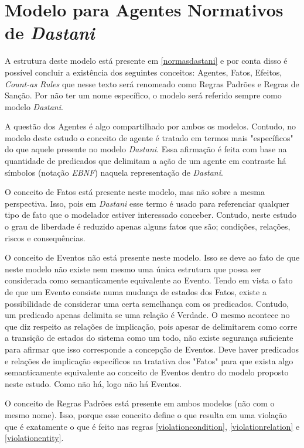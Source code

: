 \section{Modelo para Agentes Normativos de \textit{Dastani}}

A estrutura deste modelo está presente em \ref{normasdastani} e por conta disso é possível concluir a existência dos seguintes conceitos: Agentes, Fatos, Efeitos, \textit{Count-as Rules} que nesse texto será renomeado como Regras Padrões e Regras de Sanção. Por não ter um nome específico, o modelo será referido sempre como modelo \textit{Dastani}. 

A questão dos Agentes é algo compartilhado por ambos os modelos. Contudo, no modelo deste estudo o conceito de agente é tratado em termos mais "específicos" do que aquele presente no modelo \textit{Dastani}. Essa afirmação é feita com base na quantidade de predicados que delimitam a ação de um agente em contraste há símbolos (notação \textit{EBNF}) naquela representação de \textit{Dastani}. 

O conceito de Fatos está presente neste modelo, mas não sobre a mesma perspectiva. Isso, pois em \textit{Dastani} esse termo é usado para referenciar qualquer tipo de fato que o modelador estiver interessado conceber. Contudo, neste estudo o grau de liberdade é reduzido apenas alguns fatos que são; condições, relações, riscos e consequências.

O conceito de Eventos não está presente neste modelo. Isso se deve ao fato de que neste modelo não existe nem mesmo uma única estrutura que possa ser considerada como semanticamente equivalente ao Evento. Tendo em vista o fato de que um Evento consiste numa mudança de estados dos Fatos, existe a possibilidade de considerar uma certa semelhança com os predicados. Contudo, um predicado apenas delimita se uma relação é Verdade. O mesmo acontece no que diz respeito as relações de implicação, pois apesar de delimitarem como corre a transição de estados do sistema como um todo, não existe segurança suficiente para afirmar que isso corresponde a concepção de Eventos. Deve haver predicados e relações de implicação específicos na tratativa dos "Fatos" para que exista algo semanticamente equivalente ao conceito de Eventos dentro do modelo proposto neste estudo. Como não há, logo não há Eventos. 

O conceito de Regras Padrões está presente em ambos modelos (não com o mesmo nome). Isso, porque esse conceito define o que resulta em uma violação que é exatamente o que é feito nas regras \ref{violationcondition}, \ref{violationrelation} e \ref{violationentity}.

